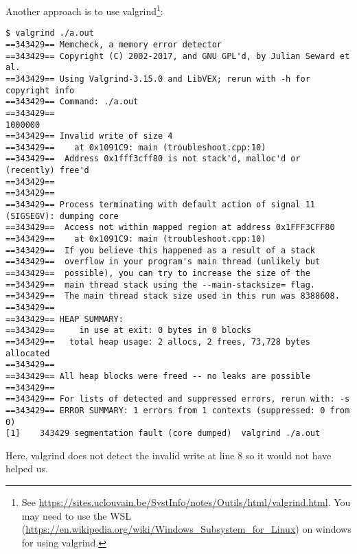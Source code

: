 \documentclass{article}
\begin{document}
Another approach is to use valgrind\footnote{See \url{https://sites.uclouvain.be/SystInfo/notes/Outils/html/valgrind.html}. You may need to use the WSL (\url{https://en.wikipedia.org/wiki/Windows_Subsystem_for_Linux}) on windows for using valgrind.}:
\begin{verbatim}
$ valgrind ./a.out
==343429== Memcheck, a memory error detector
==343429== Copyright (C) 2002-2017, and GNU GPL'd, by Julian Seward et al.
==343429== Using Valgrind-3.15.0 and LibVEX; rerun with -h for copyright info
==343429== Command: ./a.out
==343429==
1000000
==343429== Invalid write of size 4
==343429==    at 0x1091C9: main (troubleshoot.cpp:10)
==343429==  Address 0x1fff3cff80 is not stack'd, malloc'd or (recently) free'd
==343429==
==343429==
==343429== Process terminating with default action of signal 11 (SIGSEGV): dumping core
==343429==  Access not within mapped region at address 0x1FFF3CFF80
==343429==    at 0x1091C9: main (troubleshoot.cpp:10)
==343429==  If you believe this happened as a result of a stack
==343429==  overflow in your program's main thread (unlikely but
==343429==  possible), you can try to increase the size of the
==343429==  main thread stack using the --main-stacksize= flag.
==343429==  The main thread stack size used in this run was 8388608.
==343429==
==343429== HEAP SUMMARY:
==343429==     in use at exit: 0 bytes in 0 blocks
==343429==   total heap usage: 2 allocs, 2 frees, 73,728 bytes allocated
==343429==
==343429== All heap blocks were freed -- no leaks are possible
==343429==
==343429== For lists of detected and suppressed errors, rerun with: -s
==343429== ERROR SUMMARY: 1 errors from 1 contexts (suppressed: 0 from 0)
[1]    343429 segmentation fault (core dumped)  valgrind ./a.out
\end{verbatim}
Here, valgrind does not detect the invalid write at line 8 so it would not have helped us.
\end{document}
